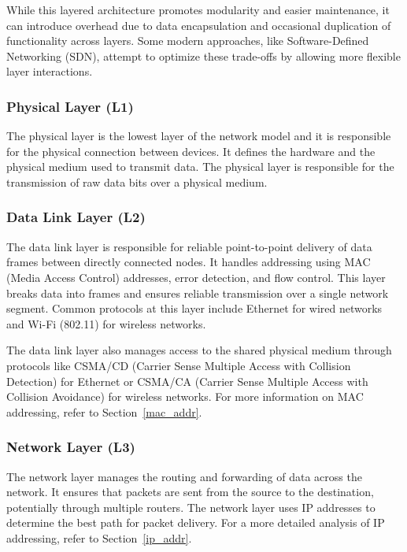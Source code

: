While this layered architecture promotes modularity and easier maintenance, it can introduce overhead due to data encapsulation and occasional duplication of functionality across layers. Some modern approaches, like Software-Defined Networking (SDN), attempt to optimize these trade-offs by allowing more flexible layer interactions.

\subsubsection{Physical Layer (L1)} \label{layer1}

The physical layer is the lowest layer of the network model and it is responsible for the physical connection between devices. It defines the hardware and the physical medium used to transmit data. The physical layer is responsible for the transmission of raw data bits over a physical medium.

\subsubsection{Data Link Layer (L2)} \label{layer2}

The data link layer is responsible for reliable point-to-point delivery of data frames between directly connected nodes. It handles addressing using MAC (Media Access Control) addresses, error detection, and flow control. This layer breaks data into frames and ensures reliable transmission over a single network segment. Common protocols at this layer include Ethernet for wired networks and Wi-Fi (802.11) for wireless networks.

The data link layer also manages access to the shared physical medium through protocols like CSMA/CD (Carrier Sense Multiple Access with Collision Detection) for Ethernet or CSMA/CA (Carrier Sense Multiple Access with Collision Avoidance) for wireless networks. For more information on MAC addressing, refer to Section~\ref{mac_addr}.

\subsubsection{Network Layer (L3)}
\label{layer3}

The network layer manages the routing and forwarding of data across the network. It ensures that packets are sent from the source to the destination, potentially through multiple routers. The network layer uses IP addresses to determine the best path for packet delivery. For a more detailed analysis of IP addressing, refer to Section~\ref{ip_addr}.

